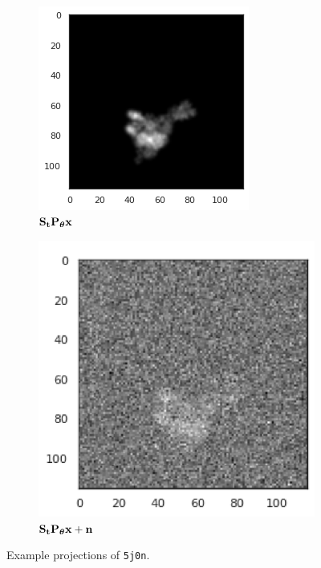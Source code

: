 \begin{figure}[ht!]
\begin{minipage}[b]{0.35\linewidth}
\begin{subfigure}[b]{0.49\linewidth}
            \centering
            \includegraphics[width=0.8\linewidth]{figures/5j0n_translated}
            \caption*{$\mathbf{S}_{\mathbf{t}} \mathbf{P}_{{\boldsymbol{\theta}}} \mathbf{x}$}
        \end{subfigure}
        \hfill
        \begin{subfigure}[b]{0.49\linewidth}
            \centering
            \includegraphics[width=0.8\linewidth]{figures/5j0n_noise16_translated}
            \caption*{$\mathbf{S}_{\mathbf{t}} \mathbf{P}_{{\boldsymbol{\theta}}} \mathbf{x} + \mathbf{n}$}
        \end{subfigure}
        \caption{%
            Example projections of \texttt{5j0n}.
        }\label{fig:different-projections}
    \end{minipage}
\end{figure}

